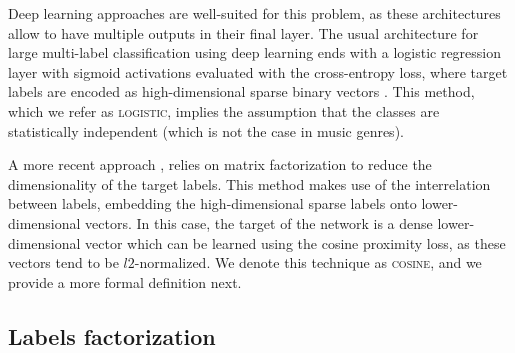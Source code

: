 Deep learning approaches are well-suited for this problem, as these architectures allow to have multiple outputs in their final layer.
The usual architecture for large multi-label classification using deep learning ends with a logistic regression layer with sigmoid activations evaluated with the cross-entropy loss, where target labels are encoded as high-dimensional sparse binary vectors \citep{szegedy2016rethinking}. 
This method, which we refer as \textsc{logistic}, implies the assumption that the classes are statistically independent (which is not the case in music genres).

A more recent approach \citep{Chollet2016}, relies on matrix factorization to reduce the dimensionality of the target labels. 
This method makes use of the interrelation between labels, embedding the high-dimensional sparse labels onto lower-dimensional vectors.
In this case, the target of the network is a dense lower-dimensional vector which can be learned using the cosine proximity loss, as these vectors tend to be $l2$-normalized. 
We denote this technique as \textsc{cosine}, and we provide a more formal definition next.

\subsection{Labels factorization}\label{sec:multi-class:factorization}




